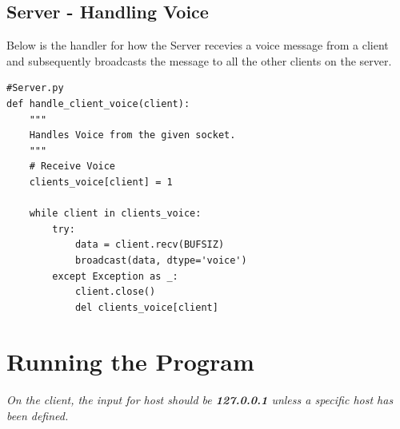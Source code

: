 \documentclass[a4paper,11pt]{article}
\begin{document}
\subsection{Server - Handling Voice}
Below is the handler for how the Server recevies a voice message from a client and subsequently broadcasts the message to all the other clients on the server.
\begin{mdframed}[backgroundcolor=light-gray, roundcorner=30pt,leftmargin=1, rightmargin=1, innerleftmargin=5, innertopmargin=-3,innerbottommargin=5, outerlinewidth=1, linecolor=light-gray]
\begin{lstlisting}
#Server.py
def handle_client_voice(client):
	"""
	Handles Voice from the given socket.
 	"""
	# Receive Voice
	clients_voice[client] = 1

	while client in clients_voice:
		try:
			data = client.recv(BUFSIZ)
			broadcast(data, dtype='voice')
		except Exception as _:
			client.close()
			del clients_voice[client]

\end{lstlisting}
\end{mdframed}

\section{Running the Program}
\textit{On the client, the input for host should be \textbf{127.0.0.1} unless a specific host has been defined.}
\end{document}
